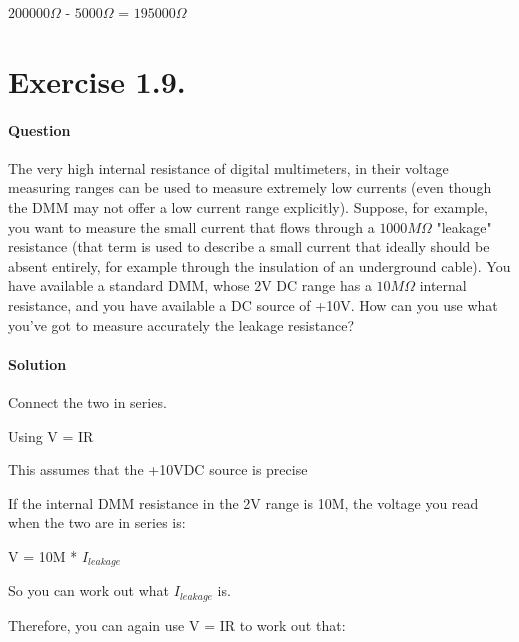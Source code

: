 \documentclass[a4paper, 12pt]{article}
\begin{document}
$200000\Omega$ - $5000\Omega$ = $195000\Omega$\newline

\clearpage

\section{Exercise 1.9.}

\paragraph{Question\newline}

The very high internal resistance of digital multimeters, in their voltage measuring ranges can be used to measure extremely low currents (even though the DMM may not offer a low current range explicitly). Suppose, for example, you want to measure the small current that flows through a $1000M\Omega$ "leakage" resistance (that term is used to describe a small current that ideally should be absent entirely, for example through the insulation of an underground cable). You have available a standard DMM, whose 2V DC range has a $10M\Omega$ internal resistance, and you have available a DC source of +10V. How can you use what you've got to measure accurately the leakage resistance?\newline

\paragraph{Solution\newline}

Connect the two in series.\newline

Using V = IR\newline

This assumes that the +10VDC source is precise\newline

If the internal DMM resistance in the 2V range is 10M, the voltage you read when the two are in series is:\newline

V = 10M * $I_{leakage}$\newline

So you can work out what $I_{leakage}$ is.\newline

Therefore, you can again use V = IR to work out that:\newline
\end{document}
